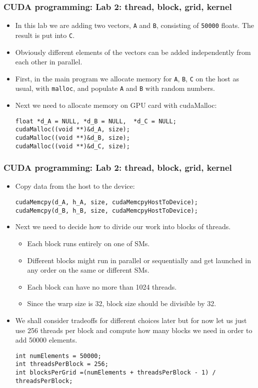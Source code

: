 \begin{frame}[fragile]
  \frametitle{CUDA programming: Lab 2: thread, block, grid, kernel}
\begin{itemize}
\item In this lab we are adding two vectors, {\color{mycolorcode}\verb|A|} and {\color{mycolorcode}\verb|B|}, 
  consisting of \verb|50000| floats. The result is put into {\color{mycolorcode}\verb|C|}.
\item Obviously different elements of the vectors can be added independently from each other in parallel.
\item First, in the main program we allocate memory for {\color{mycolorcode}\verb|A|}, 
  {\color{mycolorcode}\verb|B|}, {\color{mycolorcode}\verb|C|} 
  on the host as usual, with {\color{mycolorcode}\verb|malloc|}, and populate {\color{mycolorcode}\verb|A|} 
  and {\color{mycolorcode}\verb|B|} with random numbers.
\item Next we need to allocate memory on GPU card with {\color{mycolorcode}cudaMalloc}:
{\color{mycolorcode}
\begin{verbatim}
float *d_A = NULL, *d_B = NULL,  *d_C = NULL;
cudaMalloc((void **)&d_A, size);
cudaMalloc((void **)&d_B, size);
cudaMalloc((void **)&d_C, size);
\end{verbatim}
}

\end{itemize}
\end{frame}


\begin{frame}[fragile]
  \frametitle{CUDA programming: Lab 2: thread, block, grid, kernel}
\begin{itemize}
\item Copy data from the host to the device:
{\color{mycolorcode}
\begin{verbatim}
cudaMemcpy(d_A, h_A, size, cudaMemcpyHostToDevice);
cudaMemcpy(d_B, h_B, size, cudaMemcpyHostToDevice);
\end{verbatim}
}
\item Next we need to decide how to divide our work into blocks of threads.
  \begin{itemize}
  \item Each block runs entirely on one of SMs. 
  \item Different blocks might run in parallel or sequentially and get launched in any order on the same or different SMs.
  \item Each block can have no more than 1024 threads.
  \item Since the warp size is 32, block size should be divisible by 32.
  \end{itemize}
\item We shall consider tradeoffs for different choices later but for now let us just use 
  256 threads per block and compute how many blocks we need in order to add 50000 elements.
{\tiny
{\color{mycolorcode}
\begin{verbatim}
int numElements = 50000;
int threadsPerBlock = 256;
int blocksPerGrid =(numElements + threadsPerBlock - 1) / threadsPerBlock;
\end{verbatim}
}
}
\end{itemize}
\end{frame}


